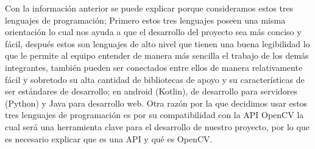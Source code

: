 Con la información anterior se puede explicar porque consideramos estos tres lenguajes de programación; Primero estos tres lenguajes poseen una misma orientación lo cual nos ayuda a que el desarrollo del proyecto sea más conciso y fácil, después estos son lenguajes de alto nivel que tienen una buena legibilidad lo que le permite al equipo entender de manera más sencilla el trabajo de los demás integrantes, también pueden ser conectados entre ellos de manera relativamente fácil y sobretodo su alta cantidad de bibliotecas de apoyo y su características de ser  estándares de desarrollo; en android (Kotlin), de desarrollo para servidores (Python) y Java para desarrollo web.
Otra razón por la que decidimos usar estos tres lenguajes de programación es por su compatibilidad con la API OpenCV la cual será una herramienta clave para el desarrollo de nuestro proyecto, por lo que es necesario explicar que es una API y qué es OpenCV.

